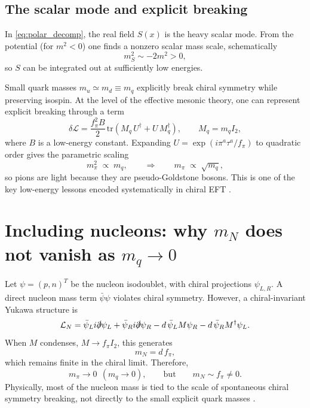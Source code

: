 \subsection{The scalar mode and explicit breaking}

In \eqref{eq:polar_decomp}, the real field $S(x)$ is the heavy scalar mode.
From the potential (for $m^2<0$) one finds a nonzero scalar mass scale, schematically
\begin{equation}
m_S^2 \sim -2m^2 > 0,
\end{equation}
so $S$ can be integrated out at sufficiently low energies.

Small quark masses $m_u\simeq m_d\equiv m_q$ explicitly break chiral symmetry while preserving isospin.
At the level of the effective mesonic theory, one can represent explicit breaking through a term
\begin{equation}
\delta\mathcal{L}
= \frac{f_\pi^2 B}{2}\,\mathrm{tr}\!\left(M_q\,U^\dagger + U\,M_q^\dagger\right),
\qquad M_q=m_q I_2,
\label{eq:explicit_breaking_term}
\end{equation}
where $B$ is a low-energy constant.
Expanding $U=\exp(i\pi^a\tau^a/f_\pi)$ to quadratic order gives the parametric scaling
\begin{equation}
m_\pi^2 \;\propto\; m_q,
\qquad\Rightarrow\qquad
m_\pi \;\propto\; \sqrt{m_q},
\label{eq:mpi_scaling}
\end{equation}
so pions are light because they are pseudo-Goldstone bosons.
This is one of the key low-energy lessons encoded systematically in chiral EFT
\citep{donoghue1992,schwartz2014,thomson2013}.

\section{Including nucleons: why $m_N$ does not vanish as $m_q\to 0$}

Let $\psi=(p,n)^T$ be the nucleon isodoublet, with chiral projections $\psi_{L,R}$.
A direct nucleon mass term $\bar\psi\psi$ violates chiral symmetry.
However, a chiral-invariant Yukawa structure is
\begin{equation}
\mathcal{L}_N
=\bar\psi_L i\slashed{\partial}\psi_L+\bar\psi_R i\slashed{\partial}\psi_R
- d\,\bar\psi_L M \psi_R - d\,\bar\psi_R M^\dagger \psi_L.
\label{eq:nucleon_yukawa}
\end{equation}
When $M$ condenses, $M\to f_\pi I_2$, this generates
\begin{equation}
m_N = d\,f_\pi,
\label{eq:mN_from_fpi}
\end{equation}
which remains finite in the chiral limit. Therefore,
\begin{equation}
m_\pi \to 0 \ \ (m_q\to 0),
\qquad \text{but}\qquad
m_N \sim f_\pi \neq 0.
\end{equation}
Physically, most of the nucleon mass is tied to the scale of spontaneous chiral symmetry breaking,
not directly to the small explicit quark masses
\citep{peskin1995,schwartz2014,donoghue1992}.

